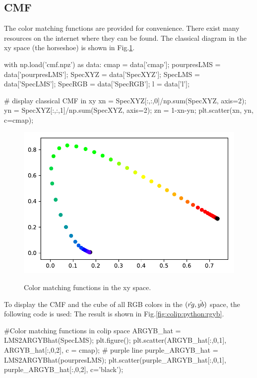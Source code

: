 \subsection{CMF}
The color matching functions are provided for convenience. There exist many resources on the internet where they can be found. The classical diagram in the xy space (the horseshoe) is shown in Fig.\ref{fig:colip:python:xy}.

\begin{python}
with np.load('cmf.npz') as data:
    cmap = data['cmap'];
    pourpresLMS = data['pourpresLMS'];
    SpecXYZ = data['SpecXYZ'];
    SpecLMS = data['SpecLMS'];
    SpecRGB = data['SpecRGB'];
    l = data['l'];
    
# display classical CMF in xy
xn = SpecXYZ[:,:,0]/np.sum(SpecXYZ, axis=2);
yn = SpecXYZ[:,:,1]/np.sum(SpecXYZ, axis=2);
zn = 1-xn-yn;
plt.scatter(xn, yn, c=cmap);
\end{python}

\begin{figure}[htbp]
	\centering\caption{Color matching functions in the xy space.}%
	\includegraphics[width=.8\linewidth]{xy.python.pdf}%
	\label{fig:colip:python:xy}%
\end{figure}

To display the CMF and the cube of all RGB colors in the  $(\mathop{\hat{rg}}\nolimits,\mathop{\hat{yb}}\nolimits)$ space, the following code is used:
The result is shown in Fig.\ref{fig:colip:python:rgyb}.
\begin{python}
#Color matching functions in colip space
ARGYB_hat = LMS2ARGYBhat(SpecLMS);
plt.figure();
plt.scatter(ARGYB_hat[:,0,1], ARGYB_hat[:,0,2], c = cmap);
# purple line
purple_ARGYB_hat = LMS2ARGYBhat(pourpresLMS);
plt.scatter(purple_ARGYB_hat[:,0,1], purple_ARGYB_hat[:,0,2], c='black');
\end{python}

